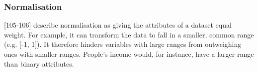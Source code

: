 




\subsubsection{Normalisation}
\label{section:Normalisation}



\textcite{han2011data}[105-106] describe normalisation as giving the attributes of a dataset equal weight. For example, it can transform the data to fall in a smaller, common range (e.g. [-1, 1]). It therefore hinders variables with large ranges from outweighing ones with smaller ranges. People's income would, for instance, have a larger range than binary attributes. 


